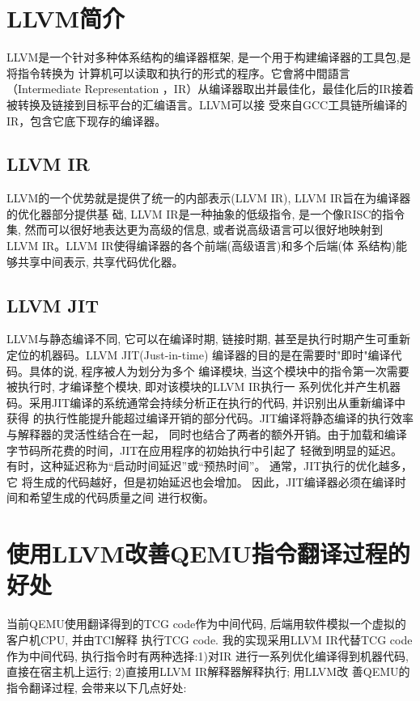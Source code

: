 \section{LLVM简介}
    LLVM是一个针对多种体系结构的编译器框架, 是一个用于构建编译器的工具包,是将指令转换为
    计算机可以读取和执行的形式的程序。它會將中間語言（Intermediate Representation
    ，IR）从编译器取出并最佳化，最佳化后的IR接着被转换及链接到目标平台的汇编语言。LLVM可以接
    受來自GCC工具链所编译的IR，包含它底下现存的编译器。

\subsection{LLVM IR}
    LLVM的一个优势就是提供了统一的内部表示(LLVM IR), LLVM IR旨在为编译器的优化器部分提供基
    础, LLVM IR是一种抽象的低级指令, 是一个像RISC的指令集, 然而可以很好地表达更为高级的信息,
    或者说高级语言可以很好地映射到LLVM IR。LLVM IR使得编译器的各个前端(高级语言)和多个后端(体
    系结构)能够共享中间表示, 共享代码优化器。

\subsection{LLVM JIT}
    LLVM与静态编译不同, 它可以在编译时期, 链接时期, 甚至是执行时期产生可重新定位的机器码。LLVM
    JIT(Just-in-time) 编译器的目的是在需要时"即时"编译代码。具体的说, 程序被人为划分为多个
    编译模块, 当这个模块中的指令第一次需要被执行时, 才编译整个模块, 即对该模块的LLVM IR执行一
    系列优化并产生机器码。采用JIT编译的系统通常会持续分析正在执行的代码, 并识别出从重新编译中获得
    的执行性能提升能超过编译开销的部分代码。JIT编译将静态编译的执行效率与解释器的灵活性结合在一起，
    同时也结合了两者的额外开销。由于加载和编译字节码所花费的时间，JIT在应用程序的初始执行中引起了
    轻微到明显的延迟。 有时，这种延迟称为“启动时间延迟”或“预热时间”。 通常，JIT执行的优化越多，它
    将生成的代码越好，但是初始延迟也会增加。 因此，JIT编译器必须在编译时间和希望生成的代码质量之间
    进行权衡。

\section{使用LLVM改善QEMU指令翻译过程的好处}
    当前QEMU使用翻译得到的TCG code作为中间代码, 后端用软件模拟一个虚拟的客户机CPU, 并由TCI解释
    执行TCG code. 我的实现采用LLVM IR代替TCG code作为中间代码, 执行指令时有两种选择:1)对IR
    进行一系列优化编译得到机器代码, 直接在宿主机上运行; 2)直接用LLVM IR解释器解释执行; 用LLVM改
    善QEMU的指令翻译过程, 会带来以下几点好处:

